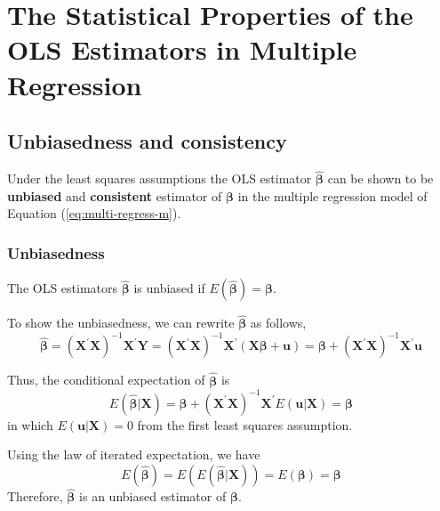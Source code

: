 \documentclass[a4paper,11pt]{article}
\begin{document}
\section{The Statistical Properties of the OLS Estimators in Multiple Regression}
\label{sec:org5baa416}

\subsection{Unbiasedness and consistency}
\label{sec:orgfc4dbca}

Under the least squares assumptions the OLS estimator
\(\hat{\boldsymbol{\beta}}\) can be shown to be \textbf{unbiased} and
\textbf{consistent} estimator of \(\boldsymbol{\beta}\) in the multiple
regression model of Equation (\ref{eq:multi-regress-m}).

\subsubsection*{Unbiasedness}
\label{sec:orgc84eaa6}

The OLS estimators \(\hat{\boldsymbol{\beta}}\) is unbiased if
\(E(\hat{\boldsymbol{\beta}}) = \boldsymbol{\beta}\).

To show the unbiasedness, we can rewrite \(\hat{\boldsymbol{\beta}}\) as
follows,
\begin{equation}
\label{eq:bhat-m-a}
\hat{\boldsymbol{\beta}} = \left(\mathbf{X}^{\prime} \mathbf{X}\right)^{-1} \mathbf{X}^{\prime} \mathbf{Y}
= \left(\mathbf{X}^{\prime} \mathbf{X} \right)^{-1} \mathbf{X}^{\prime} (\mathbf{X} \boldsymbol{\beta} + \mathbf{u})
= \boldsymbol{\beta} + \left(\mathbf{X}^{\prime} \mathbf{X}\right)^{-1} \mathbf{X}^{\prime} \mathbf{u}
\end{equation}

Thus, the conditional expectation of \(\hat{\boldsymbol{\beta}}\) is
\begin{equation}
\label{eq:bhat-unbias}
E(\hat{\boldsymbol{\beta}} | \mathbf{X}) = \boldsymbol{\beta} + \left(\mathbf{X}^{\prime} \mathbf{X}\right)^{-1} \mathbf{X}^{\prime} E(\mathbf{u} | \mathbf{X}) = \boldsymbol{\beta}
\end{equation}
in which \(E(\mathbf{u} | \mathbf{X}) = 0\) from the first least squares
assumption.

Using the law of iterated expectation, we have
\[ E(\hat{\boldsymbol{\beta}}) = E(E(\hat{\boldsymbol{\beta}} |
\mathbf{X})) = E(\boldsymbol{\beta}) = \boldsymbol{\beta} \]
Therefore, \(\hat{\boldsymbol{\beta}}\) is an unbiased estimator of
\(\boldsymbol{\beta}\).
\end{document}
